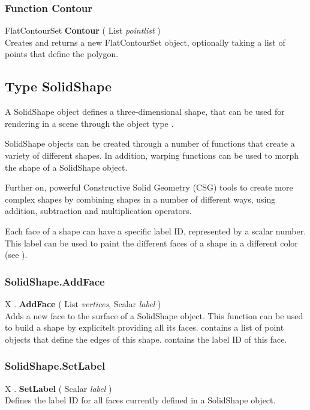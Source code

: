 \subsubsection{Function Contour \label{F:Contour}}
FlatContourSet \textbf{Contour} ( List \textit{pointlist} ) \\
Creates and returns a new FlatContourSet object, optionally taking a list of points that define the polygon.

\subsection{Type SolidShape \label{T:SolidShape}}
A SolidShape object defines a three-dimensional shape, that can be used for rendering in a scene through the object type .

SolidShape objects can be created through a number of functions that create a variety of different shapes. In addition, warping functions can be used to morph the shape of a SolidShape object.

Further on, powerful Constructive Solid Geometry (CSG) tools to create more complex shapes by combining shapes in a number of different ways, using addition, subtraction and multiplication operators.

Each face of a shape can have a specific label ID, represented by a scalar number. This label can be used to paint the different faces of a shape in a different color (see ).

\subsubsection{SolidShape.AddFace \label{F:SolidShape:AddFace}}
X . \textbf{AddFace} ( List \textit{vertices}, Scalar \textit{label} ) \\
Adds a new face to the surface of a SolidShape object. This function can be used to build a shape by explicitelt providing all its faces.  contains a list of point objects that define the edges of this shape.  contains the label ID of this face.

\subsubsection{SolidShape.SetLabel \label{F:SolidShape:SetLabel}}
X . \textbf{SetLabel} ( Scalar \textit{label} ) \\
Defines the label ID for all faces currently defined in a SolidShape object.

